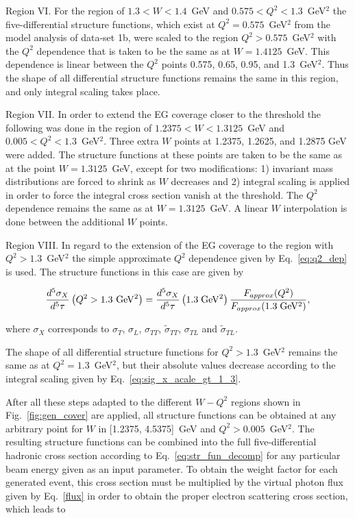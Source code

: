 Region VI. For the region of $1.3 < W < 1.4$~GeV and $0.575 < Q^2 < 1.3$~GeV$^2$ the five-differential structure functions, which exist at $Q^2 = 0.575$~GeV$^2$ from the model analysis of data-set 1b, were scaled to the region $Q^2 > 0.575$~GeV$^2$ with the $Q^2$ dependence that is taken to be the same as at $W = 1.4125$~GeV. This dependence is linear between the $Q^2$ points 0.575, 0.65, 0.95, and 1.3~GeV$^2$. Thus the shape of all differential structure functions remains the same in this region, and only integral scaling takes place.

Region VII. In order to extend the EG coverage closer to the threshold the following was done in the region of $1.2375 < W < 1.3125$~GeV and $0.005 < Q^2 < 1.3$~GeV$^2$. Three extra $W$ points at 1.2375, 1.2625, and 1.2875 GeV were added. The structure functions at these points are taken to be the same as at the point $W = 1.3125$~GeV, except for two modifications: 1) invariant mass distributions are forced to shrink as $W$ decreases and 2) integral scaling is applied in order to force the integral cross section vanish at the threshold. The $Q^2$ dependence remains the same as at $W=1.3125$~GeV. A linear $W$ interpolation is done between the additional $W$ points.  
 


Region VIII. In regard to the extension of the EG coverage to the region with $Q^2 > 1.3$~GeV$^2$ the simple approximate $Q^2$ dependence given by Eq.~\eqref{eq:q2_dep} is used. The structure functions in this case are given by


\begin{equation}
\frac{d^5\sigma_{X}}{d^5\tau}\left ( Q^2  > 1.3~{\rm GeV^2} \right ) = \frac{d^5\sigma_{X}}{d^5\tau}\left ( 1.3\;{\rm GeV^2} \right )\frac{F_{approx}(Q^2)}{F_{approx}(1.3\;{\rm GeV^2})},
\label{eq:sig_x_acale_gt_1_3}
\end{equation}

where $\sigma_X$ corresponds to $\sigma_{T}$, $\sigma_{L}$, $\sigma_{TT}$, $\widetilde{\sigma}_{TT}$, $\sigma_{TL}$ and $\widetilde{\sigma}_{TL}$.

The shape of all differential structure functions for $Q^2 > 1.3$~GeV$^2$ remains the same as at  $Q^2 = 1.3$~GeV$^2$, but their absolute values decrease according to the integral scaling given by Eq.~\eqref{eq:sig_x_acale_gt_1_3}.

After all these steps adapted to the different $W-Q^2$ regions shown in Fig.~\ref{fig:gen_cover} are applied, all structure functions can be obtained at any arbitrary point for $W$ in [1.2375, 4.5375]~GeV and $Q^2 > 0.005$~GeV$^2$. The resulting structure functions can be combined into the full five-differential hadronic cross section according to Eq.~\eqref{eq:str_fun_decomp} for any particular beam energy given as an input parameter. To obtain the weight factor for each generated event, this cross section must be multiplied by the virtual photon flux given by Eq.~\eqref{flux} in order to obtain the proper electron scattering cross section, which leads to

